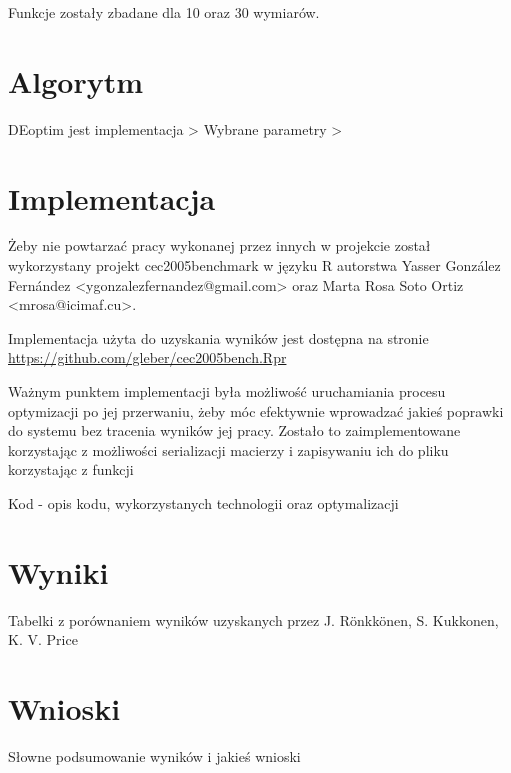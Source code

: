 \documentclass[11pt]{article}
\begin{document}
Funkcje zostały zbadane dla 10 oraz 30 wymiarów.
\section{Algorytm}
\label{sec-2}


DEoptim jest implementacja >
Wybrane parametry >
\section{Implementacja}
\label{sec-3}


Żeby nie powtarzać pracy wykonanej przez innych w projekcie został
wykorzystany projekt cec2005benchmark w języku R autorstwa Yasser
González Fernández <ygonzalezfernandez@gmail.com> oraz Marta Rosa Soto
Ortiz <mrosa@icimaf.cu>.

Implementacja użyta do uzyskania wyników jest dostępna na stronie
\href{https://github.com/gleber/cec2005bench.Rpr}{https://github.com/gleber/cec2005bench.Rpr}

Ważnym punktem implementacji była możliwość uruchamiania procesu
optymizacji po jej przerwaniu, żeby móc efektywnie wprowadzać jakieś
poprawki do systemu bez tracenia wyników jej pracy. Zostało to
zaimplementowane korzystając z możliwości serializacji macierzy i
zapisywaniu ich do pliku korzystając z funkcji 

Kod - opis kodu, wykorzystanych technologii oraz optymalizacji
\section{Wyniki}
\label{sec-4}


Tabelki z porównaniem wyników uzyskanych przez J. Rönkkönen, S. Kukkonen, K. V. Price
\section{Wnioski}
\label{sec-5}


Słowne podsumowanie wyników i jakieś wnioski
\end{document}
